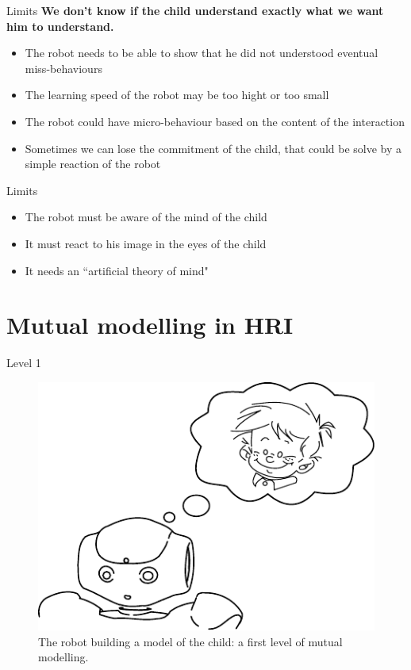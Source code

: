 \documentclass[compress]{beamer}
\begin{document}
\begin{frame}{Limits}
\textbf{We don't know if the child understand exactly what we want him to understand.}
\begin{itemize}
\item The robot needs to be able to show that he did not understood eventual miss-behaviours
\item The learning speed of the robot may be too hight or too small
\item The robot could have micro-behaviour based on the content of the interaction
\item Sometimes we can lose the commitment of the child, that could be solve by a simple reaction of the robot
\end{itemize}
\end{frame}

\begin{frame}{Limits}
\begin{itemize}
\item The robot must be aware of the mind of the child
\item It must react to his image in the eyes of the child 
\item It needs an ``artificial theory of mind"
\end{itemize}
\end{frame}

\section{Mutual modelling in HRI}

\begin{frame}{Level 1}
    \begin{figure}
        \centering
        \includegraphics[width=0.7\columnwidth]{naoMM}
        \caption{The robot building a model of the child: a first level of mutual modelling.}
    \end{figure}
\end{frame}
\end{document}
